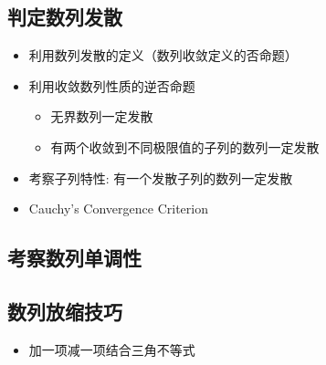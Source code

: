 \documentclass[onecolumn]{ctexart}
\begin{document}
\subsection{判定数列发散}
\begin{itemize}
  \item 利用数列发散的定义（数列收敛定义的否命题）
  \item 利用收敛数列性质的逆否命题
  \begin{itemize}
    \item 无界数列一定发散
    \item 有两个收敛到不同极限值的子列的数列一定发散
  \end{itemize}
  \item 考察子列特性: 有一个发散子列的数列一定发散
  \item Cauchy's Convergence Criterion
\end{itemize}

\subsection{考察数列单调性}

\subsection{数列放缩技巧}
\begin{itemize}
  \item 加一项减一项结合三角不等式
\end{itemize}
\end{document}
